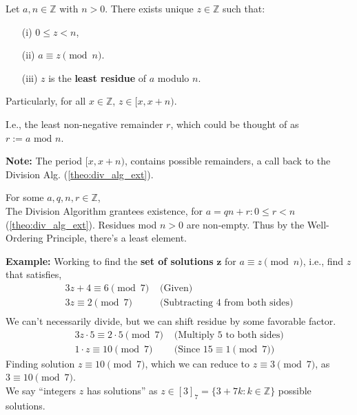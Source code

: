 \newpage

\begin{theo}

    \label{theo:least_rep}

    Let \(a, n \in \mathbb{Z}\) with \(n > 0\). There exists unique $z \in \mathbb{Z}$ such that:
    \begin{itemize}
        \item [(i)] \(0 \leq z < n\),
        \item [(ii)] \(a \equiv z \pmod{n}\).
        \item [(iii)] \(z\) is the \textbf{least residue} of \(a\) modulo \(n\).
    \end{itemize}
    Particularly, for all $x\in\mathbb{Z}$, $z\in[x,x+n)$.
\end{theo}
I.e., the least non-negative remainder $r$, which could be thought of as $r:=a\text{ mod } n$.
\begin{Note}
    \textbf{Note:} The period $[x,x+n)$, contains possible remainders, a call back to the Division Alg. (\ref{theo:div_alg_ext}).
\end{Note}

\begin{Proof}

    For some $a,q,n,r\in\mathbb{Z}$,\\
    The Division Algorithm grantees existence, for $a=qn+r:0\leq r<n$ (\ref{theo:div_alg_ext}). Residues 
    mod $n>0$ are non-empty. Thus by the Well-Ordering Principle, there's a least element.
\end{Proof}

\noindent
\textbf{Example:} Working to find the \textbf{set of solutions} $\mathbf{z}$ for $a\equiv z\pmod{n}$, i.e., find $z$ that satisfies,
\begin{align*}
3z+4 \equiv 6 \pmod{7} & \text{ (Given)} \\
3z \equiv 2 \pmod{7} & \text{ (Subtracting 4 from both sides)} \\
\end{align*}
We can't necessarily divide, but we can shift residue by some favorable factor.
\begin{align*}
3z\cdot5 \equiv 2\cdot5 \pmod{7} & \text{ (Multiply 5 to both sides)} \\
1\cdot z\equiv 10 \pmod{7} & \text{ (Since $15\equiv1\pmod{7}$)} 
\end{align*}
Finding solution $z\equiv10\pmod{7}$, which we can reduce to $z\equiv 3\pmod{7}$, as $3\equiv10\pmod{7}$.\\
We say ``integers $z$ has solutions'' as $z\in[3]_{7}=\{3+7k:k\in\mathbb{Z}\}$ possible solutions.\\

